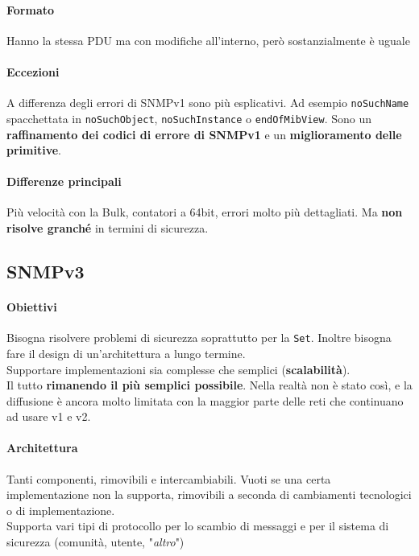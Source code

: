 \documentclass[10pt]{book}
\begin{document}
\paragraph{Formato} Hanno la stessa PDU ma con modifiche all'interno, però sostanzialmente è uguale
\paragraph{Eccezioni} A differenza degli errori di SNMPv1 sono più esplicativi. Ad esempio \texttt{noSuchName} spacchettata in \texttt{noSuchObject}, \texttt{noSuchInstance} o \texttt{endOfMibView}. Sono un \textbf{raffinamento dei codici di errore di SNMPv1} e un \textbf{miglioramento delle primitive}.
\paragraph{Differenze principali} Più velocità con la Bulk, contatori a 64bit, errori molto più dettagliati. Ma \textbf{non risolve granché} in termini di sicurezza.
\subsection{SNMPv3}
\paragraph{Obiettivi} Bisogna risolvere problemi di sicurezza soprattutto per la \texttt{Set}. Inoltre bisogna fare il design di un'architettura a lungo termine.\\
Supportare implementazioni sia complesse che semplici (\textbf{scalabilità}).\\
Il tutto \textbf{rimanendo il più semplici possibile}. Nella realtà non è stato così, e la diffusione è ancora molto limitata con la maggior parte delle reti che continuano ad usare v1 e v2.
\paragraph{Architettura} Tanti componenti, rimovibili e intercambiabili. Vuoti se una certa implementazione non la supporta, rimovibili a seconda di cambiamenti tecnologici o di implementazione.\\
Supporta vari tipi di protocollo per lo scambio di messaggi e per il sistema di sicurezza (comunità, utente, "\textit{altro}")
\end{document}
